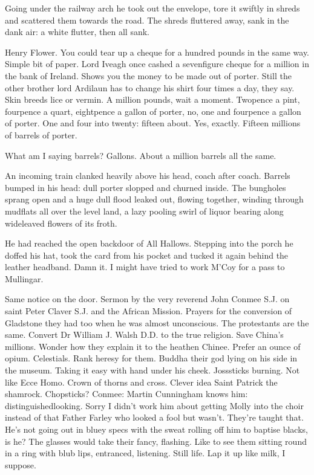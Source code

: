 Going under the railway arch he took out the envelope, tore it swiftly
in shreds and scattered them towards the road. The shreds fluttered away,
sank in the dank air: a white flutter, then all sank.

Henry Flower. You could tear up a cheque for a hundred pounds in
the same way. Simple bit of paper. Lord Iveagh once cashed a sevenfigure
cheque for a million in the bank of Ireland. Shows you the money to be
made out of porter. Still the other brother lord Ardilaun has to change
his shirt four times a day, they say. Skin breeds lice or vermin. A
million pounds, wait a moment. Twopence a pint, fourpence a quart,
eightpence a gallon of porter, no, one and fourpence a gallon of porter.
One and four into twenty: fifteen about. Yes, exactly. Fifteen millions of
barrels of porter.

What am I saying barrels? Gallons. About a million barrels all the same.

An incoming train clanked heavily above his head, coach after coach.
Barrels bumped in his head: dull porter slopped and churned inside. The
bungholes sprang open and a huge dull flood leaked out, flowing together,
winding through mudflats all over the level land, a lazy pooling swirl of
liquor bearing along wideleaved flowers of its froth.

He had reached the open backdoor of All Hallows. Stepping into the
porch he doffed his hat, took the card from his pocket and tucked it again
behind the leather headband. Damn it. I might have tried to work M'Coy
for a pass to Mullingar.

Same notice on the door. Sermon by the very reverend John Conmee
S.J. on saint Peter Claver S.J. and the African Mission. Prayers for the
conversion of Gladstone they had too when he was almost unconscious.
The protestants are the same. Convert Dr William J. Walsh D.D. to the
true religion. Save China's millions. Wonder how they explain it to the
heathen Chinee. Prefer an ounce of opium. Celestials. Rank heresy for
them. Buddha their god lying on his side in the museum. Taking it easy
with hand under his cheek. Josssticks burning. Not like Ecce Homo. Crown
of thorns and cross. Clever idea Saint Patrick the shamrock. Chopsticks?
Conmee: Martin Cunningham knows him: distinguishedlooking. Sorry I
didn't work him about getting Molly into the choir instead of that Father
Farley who looked a fool but wasn't. They're taught that. He's not going
out in bluey specs with the sweat rolling off him to baptise blacks, is
he? The glasses would take their fancy, flashing. Like to see them sitting
round in a ring with blub lips, entranced, listening. Still life. Lap it
up like milk, I suppose.


